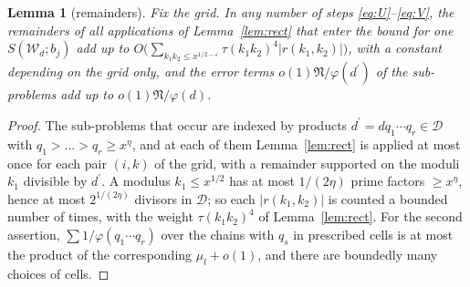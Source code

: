 \documentclass[11pt,a4paper]{amsart}
\newtheorem{lemma}[theorem]{Lemma}
\theoremstyle{remark}
\numberwithin{equation}{section}
\newcommand{\cW}{\mathcal W}
\newcommand{\cN}{\mathfrak N}
\begin{document}
\begin{lemma}[remainders]\label{lem:rem}
Fix the grid. In any number of steps \eqref{eq:U}--\eqref{eq:V}, the remainders of all applications of
Lemma~\ref{lem:rect} that enter the bound for one $S(\cW_d;b_j)$ add up to
$O\bigl(\sum_{k_1k_2\le x^{1/2-\varepsilon}}\tau(k_1k_2)^4|r(k_1,k_2)|\bigr)$, with a constant depending on the grid only,
and the error terms $o(1)\cN/\varphi(d^\prime)$ of the sub-problems add up to $o(1)\cN/\varphi(d)$.
\end{lemma}
\begin{proof}
The sub-problems that occur are indexed by products $d^\prime=dq_1\cdots q_r\in\mathcal D$ with
$q_1>\dots>q_r\ge x^\eta$, and at each of them Lemma~\ref{lem:rect} is applied at most once for each pair
$(i,k)$ of the grid, with a remainder supported on the moduli $k_1$ divisible by $d^\prime$. A modulus
$k_1\le x^{1/2}$ has at most $1/(2\eta)$ prime factors $\ge x^\eta$, hence at most $2^{1/(2\eta)}$ divisors in
$\mathcal D$; so each $|r(k_1,k_2)|$ is counted a bounded number of times, with the weight $\tau(k_1k_2)^4$ of
Lemma~\ref{lem:rect}. For the second assertion, $\sum1/\varphi(q_1\cdots q_r)$ over the chains with $q_s$ in
prescribed cells is at most the product of the corresponding $\mu_l+o(1)$, and there are boundedly many choices
of cells.
\end{proof}
\end{document}
